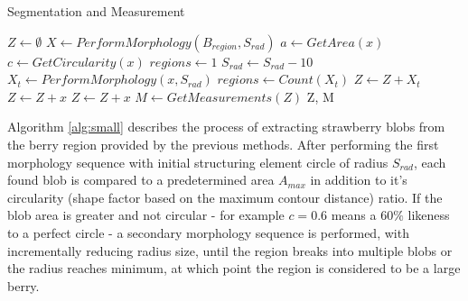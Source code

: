 \documentclass[fleqn,twoside,12pt]{report}
\begin{document}
\begin{algorithm}
	\caption{Segmentation and Measurement}
	\label{alg:small}
	\begin{algorithmic}[1]
		\State $Z \gets \emptyset$
		\State $X\gets PerformMorphology(B_{region}, S_{rad})$
			\State $a\gets GetArea(x)$
			\State $c\gets GetCircularity(x)$
				\State $regions \gets 1$
					\State $S_{rad} \gets S_{rad} - 10$
					\State $X_t\gets PerformMorphology(x, S_{rad})$
					\State $regions \gets Count(X_t)$ 
				\EndWhile
					\State $Z \gets Z + X_t$
				\Else
					\State $Z \gets Z + x$
				\EndIf
			\Else 
			\State $Z \gets Z + x$
			\EndIf
		\EndFor
		\State $M \gets GetMeasurements(Z)$ 
		\State \Return Z, M
		\EndProcedure
	\end{algorithmic}
\end{algorithm}

Algorithm \ref{alg:small} describes the process of extracting strawberry blobs from the berry region provided by the previous methods. After performing the first morphology sequence with initial structuring element circle of radius $S_{rad}$, each found blob is compared to a predetermined area $A_{max}$ in addition to it's circularity (shape factor based on the maximum contour distance) ratio. If the blob area is greater and not circular - for example $c=0.6$ means a $60\%$ likeness to a perfect circle - a secondary morphology sequence is performed, with incrementally reducing radius size, until the region breaks into multiple blobs or the radius reaches minimum, at which point the region is considered to be a large berry.
\end{document}
